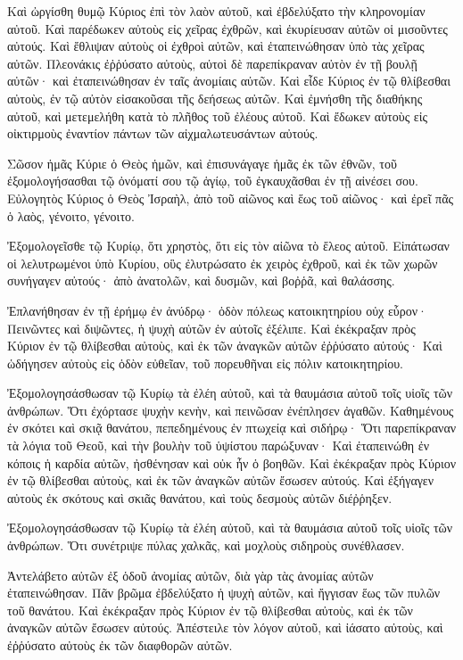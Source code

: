 \begin{spacing}{1.1}
\begin{multicols}{2}
Καὶ ὠργίσθη θυμῷ Κύριος ἐπὶ τὸν λαὸν αὐτοῦ, καὶ ἐβδελύξατο τὴν κληρονομίαν αὐτοῦ.
Καὶ παρέδωκεν αὐτοὺς εἰς χεῖρας ἐχθρῶν, καὶ ἐκυρίευσαν αὐτῶν οἱ μισοῦντες αὐτούς.
Καὶ ἔθλιψαν αὐτοὺς οἱ ἐχθροὶ αὐτῶν, καὶ ἐταπεινώθησαν ὑπὸ τὰς χεῖρας αὐτῶν.
Πλεονάκις ἐῤῥύσατο αὐτοὺς, αὐτοὶ δὲ παρεπίκραναν αὐτὸν ἐν τῇ βουλῇ αὐτῶν· καὶ ἐταπεινώθησαν ἐν ταῖς ἀνομίαις αὐτῶν.
Καὶ εἶδε Κύριος ἐν τῷ θλίβεσθαι αὐτοὺς, ἐν τῷ αὐτὸν εἰσακοῦσαι τῆς δεήσεως αὐτῶν.
Καὶ ἐμνήσθη τῆς διαθήκης αὐτοῦ, καὶ μετεμελήθη κατὰ τὸ πλῆθος τοῦ ἐλέους αὐτοῦ.
Καὶ ἔδωκεν αὐτοὺς εἰς οἰκτιρμοὺς ἐναντίον πάντων τῶν αἰχμαλωτευσάντων αὐτούς.

Σῶσον ἡμᾶς Κύριε ὁ Θεὸς ἡμῶν, καὶ ἐπισυνάγαγε ἡμᾶς ἐκ τῶν ἐθνῶν, τοῦ ἐξομολογήσασθαι τῷ ὀνόματί σου τῷ ἁγίῳ, τοῦ ἐγκαυχᾶσθαι ἐν τῇ αἰνέσει σου.
Εὐλογητὸς Κύριος ὁ Θεὸς Ἰσραὴλ, ἀπὸ τοῦ αἰῶνος καὶ ἕως τοῦ αἰῶνος· καὶ ἐρεῖ πᾶς ὁ λαὸς, γένοιτο, γένοιτο.

Ἐξομολογεῖσθε τῷ Κυρίῳ, ὅτι χρηστὸς, ὅτι εἰς τὸν αἰῶνα τὸ ἔλεος αὐτοῦ.
Εἰπάτωσαν οἱ λελυτρωμένοι ὑπὸ Κυρίου, οὓς ἐλυτρώσατο ἐκ χειρὸς ἐχθροῦ,
καὶ ἐκ τῶν χωρῶν συνήγαγεν αὐτούς· ἀπὸ ἀνατολῶν, καὶ δυσμῶν, καὶ βοῤῥᾶ, καὶ θαλάσσης.

Ἐπλανήθησαν ἐν τῇ ἐρήμῳ ἐν ἀνύδρῳ· ὁδὸν πόλεως κατοικητηρίου οὐχ εὗρον·
Πεινῶντες καὶ διψῶντες, ἡ ψυχὴ αὐτῶν ἐν αὐτοῖς ἐξέλιπε.
Καὶ ἐκέκραξαν πρὸς Κύριον ἐν τῷ θλίβεσθαι αὐτοὺς, καὶ ἐκ τῶν ἀναγκῶν αὐτῶν ἐῤῥύσατο αὐτούς·
Καὶ ὡδήγησεν αὐτοὺς εἰς ὁδὸν εὐθεῖαν, τοῦ πορευθῆναι εἰς πόλιν κατοικητηρίου.

Ἐξομολογησάσθωσαν τῷ Κυρίῳ τὰ ἐλέη αὐτοῦ, καὶ τὰ θαυμάσια αὐτοῦ τοῖς υἱοῖς τῶν ἀνθρώπων.
Ὅτι ἐχόρτασε ψυχὴν κενὴν, καὶ πεινῶσαν ἐνέπλησεν ἀγαθῶν.
Καθημένους ἐν σκότει καὶ σκιᾷ θανάτου, πεπεδημένους ἐν πτωχείᾳ καὶ σιδήρῳ·
Ὅτι παρεπίκραναν τὰ λόγια τοῦ Θεοῦ, καὶ τὴν βουλὴν τοῦ ὑψίστου παρώξυναν·
Καὶ ἐταπεινώθη ἐν κόποις ἡ καρδία αὐτῶν, ἠσθένησαν καὶ οὐκ ἦν ὁ βοηθῶν.
Καὶ ἐκέκραξαν πρὸς Κύριον ἐν τῷ θλίβεσθαι αὐτοὺς, καὶ ἐκ τῶν ἀναγκῶν αὐτῶν ἔσωσεν αὐτούς.
Καὶ ἐξήγαγεν αὐτοὺς ἐκ σκότους καὶ σκιᾶς θανάτου, καὶ τοὺς δεσμοὺς αὐτῶν διέῤῥηξεν.

Ἐξομολογησάσθωσαν τῷ Κυρίῳ τὰ ἐλέη αὐτοῦ, καὶ τὰ θαυμάσια αὐτοῦ τοῖς υἱοῖς τῶν ἀνθρώπων.
Ὅτι συνέτριψε πύλας χαλκᾶς, καὶ μοχλοὺς σιδηροὺς συνέθλασεν.

Ἀντελάβετο αὐτῶν ἐξ ὁδοῦ ἀνομίας αὐτῶν, διὰ γὰρ τὰς ἀνομίας αὐτῶν ἐταπεινώθησαν.
Πᾶν βρῶμα ἐβδελύξατο ἡ ψυχὴ αὐτῶν, καὶ ἤγγισαν ἕως τῶν πυλῶν τοῦ θανάτου.
Καὶ ἐκέκραξαν πρὸς Κύριον ἐν τῷ θλίβεσθαι αὐτοὺς, καὶ ἐκ τῶν ἀναγκῶν αὐτῶν ἔσωσεν αὐτούς.
Ἀπέστειλε τὸν λόγον αὐτοῦ, καὶ ἰάσατο αὐτοὺς, καὶ ἐῤῥύσατο αὐτοὺς ἐκ τῶν διαφθορῶν αὐτῶν.


\end{multicols}
\end{spacing}
